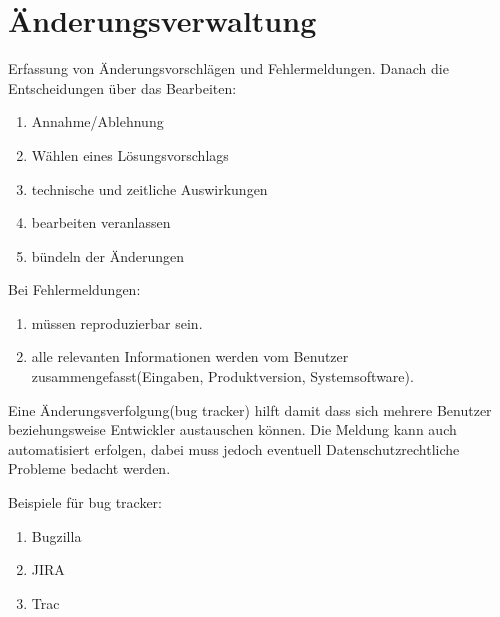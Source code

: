 \documentclass[a4paper]{article}
\theoremstyle{break}
\begin{document}
\section{Änderungsverwaltung}
Erfassung von Änderungsvorschlägen und Fehlermeldungen. Danach die Entscheidungen über das Bearbeiten:
\begin{enumerate}
\item Annahme/Ablehnung
\item Wählen eines Lösungsvorschlags
\item technische und zeitliche Auswirkungen
\item bearbeiten veranlassen
\item bündeln der Änderungen
\end{enumerate}

Bei Fehlermeldungen:
\begin{enumerate}
\item müssen reproduzierbar sein.
\item alle relevanten Informationen werden vom Benutzer zusammengefasst(Eingaben, Produktversion, Systemsoftware).
\end{enumerate}

Eine Änderungsverfolgung(bug tracker) hilft damit dass sich mehrere Benutzer beziehungsweise Entwickler austauschen können. Die Meldung kann auch automatisiert erfolgen, dabei muss jedoch eventuell Datenschutzrechtliche Probleme bedacht werden.

Beispiele für bug tracker:
\begin{enumerate}
\item Bugzilla
\item JIRA
\item Trac
\end{enumerate}
\end{document}
